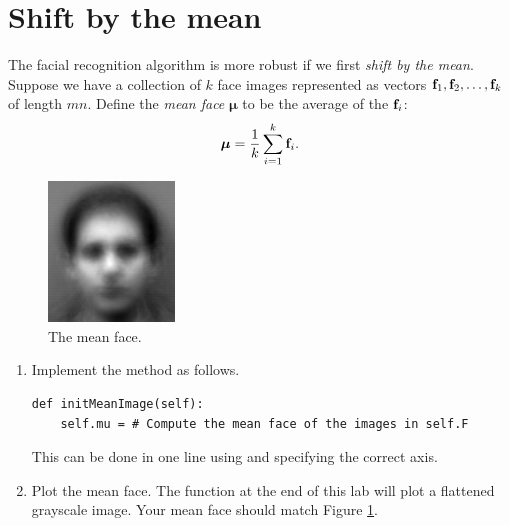 \section*{Shift by the mean}

The facial recognition algorithm is more robust if we first \emph{shift by the mean}. 
Suppose we have a collection of $k$ face images represented as vectors ${\bf f}_1, {\bf f}_2, \ldots, {\bf f}_k$ of length $mn$.
Define the \emph{mean face} ${\boldsymbol \mu}$ to be the average of the ${\bf f}_i$:
\[
{\boldsymbol \mu} = \frac{1}{k}\sum_{i=1}^k {\bf f}_i.
\]
\begin{figure}
\includegraphics[width=0.3\textwidth]{meanFace.png}
\caption{The mean face.}
\label{facialRecognition:meanFace}
\end{figure}

\begin{problem}
\label{prob:meanFace}
\leavevmode
\begin{enumerate}
\item Implement the method  as follows.
\begin{lstlisting}
def initMeanImage(self):
    self.mu = # Compute the mean face of the images in self.F
\end{lstlisting}
This can be done in one line using  and specifying the correct axis.

\item Plot the mean face. 
The function  at the end of this lab will plot a flattened grayscale image.
Your mean face should match Figure \ref{facialRecognition:meanFace}.
\end{enumerate}
\end{problem}



